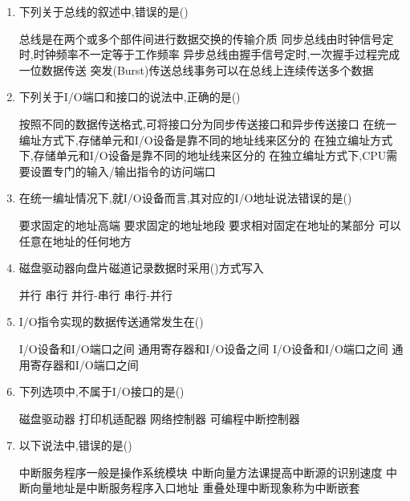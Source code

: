 \documentclass[12pt, a4paper, oneside, UTF8]{ctexbook}
\begin{document}
\begin{enumerate}
    \item \bl 下列关于总线的叙述中,错误的是() 
    \begin{choices}[1]
        \task 总线是在两个或多个部件间进行数据交换的传输介质
        \task 同步总线由时钟信号定时,时钟频率不一定等于工作频率 
        \task 异步总线由握手信号定时,一次握手过程完成一位数据传送 
        \task 突发(Burst)传送总线事务可以在总线上连续传送多个数据 
    \end{choices}

    \item 下列关于I/O端口和接口的说法中,正确的是() 
    \begin{choices}[1]
        \task 按照不同的数据传送格式,可将接口分为同步传送接口和异步传送接口
        \task 在统一编址方式下,存储单元和I/O设备是靠不同的地址线来区分的 
        \task 在独立编址方式下,存储单元和I/O设备是靠不同的地址线来区分的 
        \task 在独立编址方式下,CPU需要设置专门的输入/输出指令的访问端口 
    \end{choices}

    \item 在统一编址情况下,就I/O设备而言,其对应的I/O地址说法错误的是() 
    \begin{choices}[2] 
        \task 要求固定的地址高端
        \task 要求固定的地址地段
        \task 要求相对固定在地址的某部分
        \task 可以任意在地址的任何地方
    \end{choices}

    \item 磁盘驱动器向盘片磁道记录数据时采用()方式写入 
    \begin{choices}
        \task 并行 \task 串行 \task 并行-串行 \task 串行-并行 
    \end{choices}

    \item \bl I/O指令实现的数据传送通常发生在() 
    \begin{choices}[2]
        \task I/O设备和I/O端口之间 
        \task 通用寄存器和I/O设备之间 
        \task I/O设备和I/O端口之间 
        \task 通用寄存器和I/O端口之间 
    \end{choices}

    \item 下列选项中,不属于I/O接口的是() 
    \begin{choices}[2]
        \task 磁盘驱动器 \task 打印机适配器 \task 网络控制器 \task 可编程中断控制器 
    \end{choices}

    \item 以下说法中,错误的是() 
    \begin{choices}[1]
        \task 中断服务程序一般是操作系统模块 
        \task 中断向量方法课提高中断源的识别速度 
        \task 中断向量地址是中断服务程序入口地址 
        \task 重叠处理中断现象称为中断嵌套 
    \end{choices}


\end{enumerate}
\end{document}
